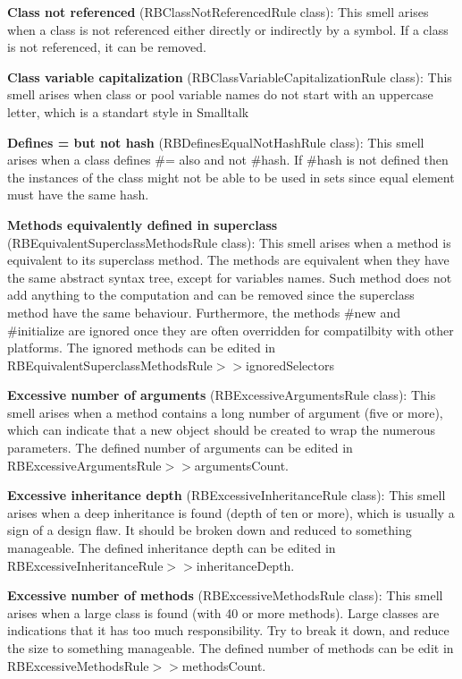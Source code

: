 \textbf{Class not referenced} (RBClassNotReferencedRule class): This smell arises when a class is not referenced either directly or indirectly by a symbol. If a class is not referenced, it can be removed.

\textbf{Class variable capitalization} (RBClassVariableCapitalizationRule class): This smell arises when class or pool variable names do not start with an uppercase letter, which is a standart style in Smalltalk

\textbf{Defines = but not hash} (RBDefinesEqualNotHashRule class): This smell arises when a class defines \#= also and not \#hash. If \#hash is not defined then the instances of the class might not be able to be used in sets since equal element must have the same hash.

\textbf{Methods equivalently defined in superclass} (RBEquivalentSuperclassMethodsRule class): This smell arises when a method is equivalent to its superclass method. The methods are equivalent when they have the same abstract syntax tree, except for variables names. Such method does not add anything to the computation and can be removed since the superclass method have the same behaviour. Furthermore, the methods \#new and \#initialize are ignored once they are often overridden for compatilbity with other platforms. The ignored methods can be edited in RBEquivalentSuperclassMethodsRule$>>$ignoredSelectors

\textbf{Excessive number of arguments} (RBExcessiveArgumentsRule class): This smell arises when a method contains a long number of argument (five or more), which can indicate that a new object should be created to wrap the numerous parameters. The defined number of arguments can be edited in RBExcessiveArgumentsRule$>>$argumentsCount.

\textbf{Excessive inheritance depth} (RBExcessiveInheritanceRule class): This smell arises when a deep inheritance is found (depth of ten or more), which is usually a sign of a design flaw. It should be broken down and reduced to something manageable. The defined inheritance depth can be edited in RBExcessiveInheritanceRule$>>$inheritanceDepth.

\textbf{Excessive number of methods} (RBExcessiveMethodsRule class): This smell arises when a large class is found (with 40 or more methods). Large classes are indications that it has too much responsibility. Try to break it down, and reduce the size to something manageable. The defined number of methods can be edit in RBExcessiveMethodsRule$>>$methodsCount.

